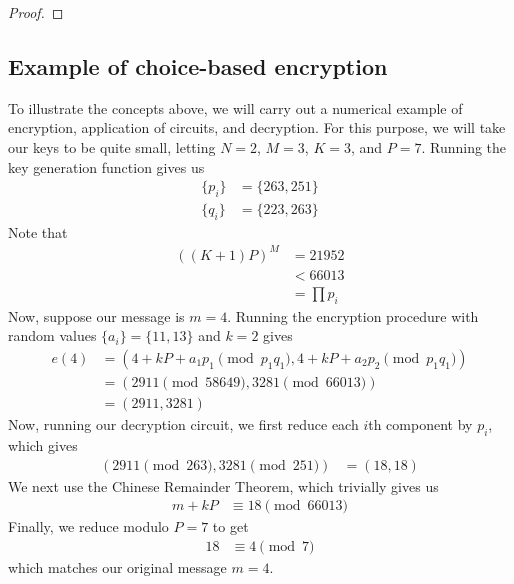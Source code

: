 \documentclass[11pt]{report}
\begin{document}
\begin{proof}
\end{proof}

\subsection{Example of choice-based encryption}
\label{sec:cbe_example}

To illustrate the concepts above, we will carry out a numerical example of encryption, application of circuits, and decryption. For this purpose, we will take our keys to be quite small, letting $N=2$, $M=3$, $K=3$, and $P=7$. Running the key generation function gives us
\begin{align*}
\{p_i\} &= \{263,251\}\\
\{q_i\} &= \{223,263\}
\end{align*}
Note that
\begin{align*}
((K+1)P)^M &= 21952\\
&< 66013\\
&= \prod p_i
\end{align*}
Now, suppose our message is $m=4$. Running the encryption procedure with random values $\{a_i\} = \{11,13\}$ and $k=2$ gives
\begin{align*}
e(4) &= (4+kP+a_1p_1 \pmod{p_1q_1},4+kP+a_2p_2\pmod{p_1q_1}) \\
&= (2911 \pmod{58649}, 3281 \pmod{66013})\\
&= (2911, 3281)
\end{align*}
Now, running our decryption circuit, we first reduce each $i$th component by $p_i$, which gives
\begin{align*}
(2911 \pmod{263}, 3281 \pmod{251}) &= (18,18)
\end{align*}
We next use the Chinese Remainder Theorem, which trivially gives us
\begin{align*}
m+kP &\equiv 18 \pmod{66013}
\end{align*}
Finally, we reduce modulo $P=7$ to get
\begin{align*}
18 &\equiv 4 \pmod{7}
\end{align*}
which matches our original message $m=4$.
\end{document}
